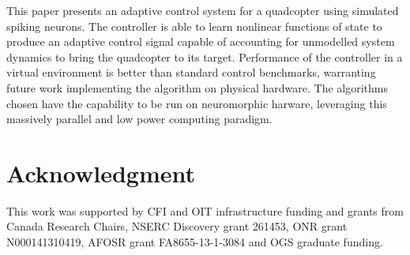 \documentclass[letterpaper, 10 pt, conference]{ieeeconf}  %
\begin{document}
This paper presents an adaptive control system for a quadcopter using simulated spiking neurons.
The controller is able to learn nonlinear functions of state to produce an adaptive control signal capable of accounting for unmodelled system dynamics to bring the quadcopter to its target.
Performance of the controller in a virtual environment is better than standard control benchmarks, warranting future work implementing the algorithm on physical hardware.
The algorithms chosen have the capability to be run on neuromorphic harware, leveraging this massively parallel and low power computing paradigm.




\addtolength{\textheight}{-12cm}   %






\section*{Acknowledgment}

This work was supported by CFI and OIT infrastructure funding and grants from Canada Research Chairs, NSERC Discovery grant 261453, ONR grant N000141310419, AFOSR grant FA8655-13-1-3084 and OGS graduate funding.




\end{document}
